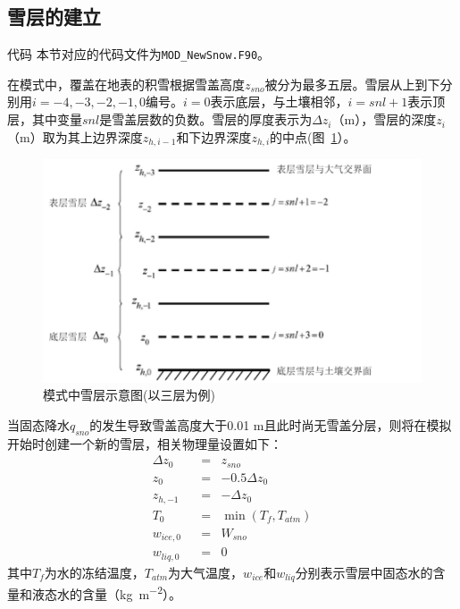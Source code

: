 \subsection{雪层的建立}
\begin{mymdframed}{代码}
本节对应的代码文件为\texttt{MOD\_NewSnow.F90}。
\end{mymdframed}

在模式中，覆盖在地表的积雪根据雪盖高度$z_{sno}$被分为最多五层。雪层从上到下分别用$i = −4, −3, −2, −1, 0$编号。$i = 0$表示底层，与土壤相邻，$i = snl + 1$表示顶层，其中变量$snl$是雪盖层数的负数。雪层的厚度表示为$\Delta z_i$（m），雪层的深度$z_i$（m）取为其上边界深度$z_{h,i-1}$和下边界深度$z_{h,i}$的中点(图~\ref{fig:模式中积雪雪层示意图}）。
{
\begin{figure}[h]
\centering
\includegraphics{Figures/雪盖土壤热力过程/模式中积雪雪层示意图.png}
\caption{模式中雪层示意图(以三层为例)}
\label{fig:模式中积雪雪层示意图}
\end{figure}
}

当固态降水$q_{sno}$的发生导致雪盖高度大于0.01 m且此时尚无雪盖分层，则将在模拟开始时创建一个新的雪层，相关物理量设置如下：
\begin{equation}
\begin{aligned}
& \Delta z_{0} &&= &{z}_{sno}& \\
& z_0 &&= &-0.5\Delta z_0& \\
& z_{h,-1} &&= &-\Delta z_0& \\
& T_0 &&= &\min \left(T_f,T_{atm}\right)& \\
& w_{ice,0} &&= &W_{sno}& \\
& w_{liq,0} &&= &0&
\end{aligned}
\end{equation}
其中$T_f$为水的冻结温度，$T_{atm}$为大气温度，$w_{ice}$和$w_{liq}$分别表示雪层中固态水的含量和液态水的含量（\unit{kg.m^{-2}}）。


